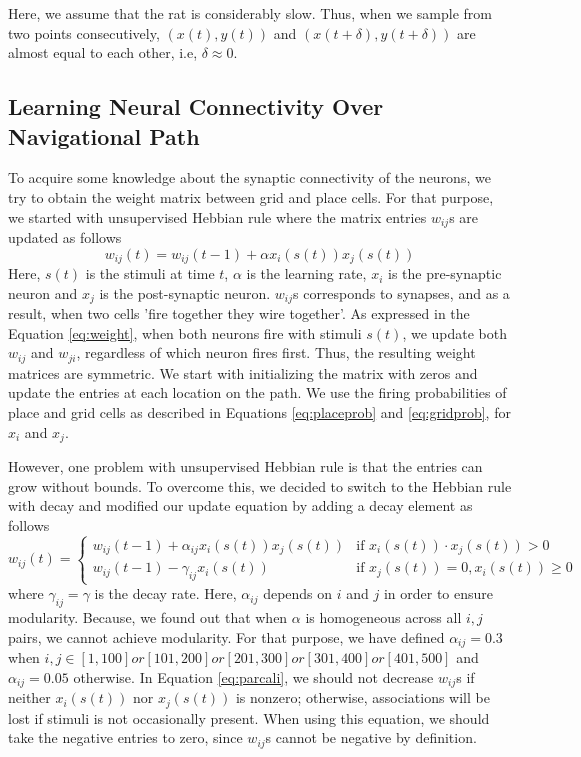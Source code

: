 \documentclass[11pt, letterpaper, onecolumn]{article}
\begin{document}
Here, we assume that the rat is considerably slow. Thus, when we sample from two points consecutively, $ (x(t),y(t)) $ and $ (x(t+\delta),y(t+\delta)) $ are almost equal to each other, i.e, $ \delta \approx 0 $.

\subsection{Learning Neural Connectivity Over Navigational Path}

To acquire some knowledge about the synaptic connectivity of the neurons, we try to obtain the weight matrix between grid and place cells. For that purpose, we started with unsupervised Hebbian rule where the matrix entries $ w_{ij} $s are updated as follows
\begin{equation}
\label{eq:weight}
w_{ij}(t) = w_{ij}(t-1) + \alpha x_{i}(s(t)) x_{j}(s(t))
\end{equation}
Here, $ s(t) $ is the stimuli at time $ t $, $ \alpha $ is the learning rate, $ x_{i} $ is the pre-synaptic neuron and $ x_{j} $ is the post-synaptic neuron. $ w_{ij} $s corresponds to synapses, and as a result, when two cells 'fire together they wire together'. As expressed in the Equation \ref{eq:weight}, when both neurons fire with stimuli $ s(t) $, we update both $ w_{ij} $ and $ w_{ji} $, regardless of which neuron fires first. Thus, the resulting weight matrices are symmetric. We start with initializing the matrix with zeros and update the entries at each location on the path. We use the firing probabilities of place and grid cells as described in Equations \ref{eq:placeprob} and \ref{eq:gridprob}, for $ x_{i} $ and $ x_{j} $.

However, one problem with unsupervised Hebbian rule is that the entries can grow without bounds. To overcome this, we decided to switch to the Hebbian rule with decay and modified our update equation by adding a decay element as follows
\begin{equation}
\label{eq:parcali}
w_{ij}(t) = \begin{cases} 
     		 w_{ij}(t-1) + \alpha_{ij} x_{i}(s(t)) x_{j}(s(t)) & \mbox{if  } x_{i}(s(t)) \cdot x_{j}(s(t))>0 \\
     		 w_{ij}(t-1) - \gamma_{ij} x_{i}(s(t)) & \mbox{if  } x_{j}(s(t))=0, x_{i}(s(t)) \geq 0
  		 	\end{cases}
\end{equation}
where $ \gamma_{ij} = \gamma $ is the decay rate. Here, $ \alpha_{ij} $ depends on $ i $ and $ j $ in order to ensure modularity. Because, we found out that when $ \alpha $ is homogeneous across all $ i,j $ pairs, we cannot achieve modularity. For that purpose, we have defined $ \alpha_{ij} = 0.3 $ when $ i,j \in [1,100] or [101,200] or [201,300] or [301,400]or [401,500] $ and $ \alpha_{ij} = 0.05 $ otherwise. In Equation \ref{eq:parcali}, we should not decrease $ w_{ij} $s if neither $ x_{i}(s(t)) $ nor $ x_{j}(s(t)) $ is nonzero; otherwise, associations will be lost if stimuli is not occasionally present. When using this equation, we should take the negative entries to zero, since $ w_{ij} $s cannot be negative by definition.
\end{document}
